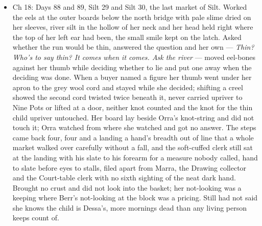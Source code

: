 \documentclass{design/chronicle}
\begin{document}
{\begin{itemize}[leftmargin=1.4em,itemsep=1pt,topsep=3pt,parsep=0pt]
\item Ch 18: Days 88 and 89, Silt 29 and Silt 30, the last market of Silt. Worked the eels at the outer boards below the north bridge with pale slime dried on her sleeves, river silt in the hollow of her neck and her head held right where the top of her left ear had been, the small smile kept on the latch. Asked whether the run would be thin, answered the question and her own --- \emph{Thin? Who’s to say thin? It comes when it comes. Ask the river} --- moved eel-bones against her thumb while deciding whether to lie and put one away when the deciding was done. When a buyer named a figure her thumb went under her apron to the grey wool cord and stayed while she decided; shifting a creel showed the second cord twisted twice beneath it, never carried upriver to Nine Pots or lifted at a door, neither knot counted and the knot for the thin child upriver untouched. Her board lay beside Orra’s knot-string and did not touch it; Orra watched from where she watched and got no answer. The steps came back four, four and a landing a hand’s breadth out of line that a whole market walked over carefully without a fall, and the soft-cuffed clerk still sat at the landing with his slate to his forearm for a measure nobody called, hand to slate before eyes to stalls, filed apart from Marra, the Drawing collector and the Court-table clerk with no sixth sighting of the neat dark hand. Brought no crust and did not look into the basket; her not-looking was a keeping where Berr’s not-looking at the block was a pricing. Still had not said she knows the child is Dessa’s, more mornings dead than any living person keeps count of.

\end{itemize}

\begin{itemize}[leftmargin=1.4em,itemsep=1pt,topsep=3pt,parsep=0pt]


\end{itemize}}
\end{document}
